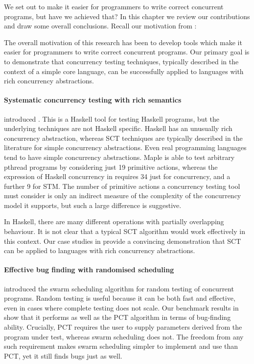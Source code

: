 We set out to make it easier for programmers to write correct
concurrent programs, but have we achieved that?  In this chapter we
review our contributions and draw some overall conclusions.  Recall
our motivation from :

\begin{displayquote}
  The overall motivation of this research has been to develop tools
  which make it easier for programmers to write correct concurrent
  programs.  Our primary goal is to demonstrate that concurrency
  testing techniques, typically described in the context of a simple
  core language, can be successfully applied to languages with rich
  concurrency abstractions.
\end{displayquote}

\paragraph{Systematic concurrency testing with rich semantics}
 introduced \dejafu{}.  This is a Haskell tool for
testing Haskell programs, but the underlying techniques are not
Haskell specific.  Haskell has an unusually rich concurrency
abstraction, whereas SCT techniques are typically described in the
literature for simple concurrency abstractions.  Even real programming
languages tend to have simple concurrency abstractions.
Maple \parencite{yu2012} is able to test arbitrary pthread programs by
considering just 19 primitive actions, whereas the expression of
Haskell concurrency in \dejafu{} requires 34 just for concurrency, and
a further 9 for STM.  The number of primitive actions a concurrency
testing tool must consider is only an indirect measure of the
complexity of the concurrency model it supports, but such a large
difference is suggestive.

In Haskell, there are many different operations with partially
overlapping behaviour.  It is not clear that a typical SCT algorithm
would work effectively in this context.  Our case studies in
 provide a convincing demonstration that
SCT can be applied to languages with rich concurrency abstractions.

\paragraph{Effective bug finding with randomised scheduling}
 introduced the swarm scheduling algorithm for
random testing of concurrent programs.  Random testing is useful
because it can be both fast and effective, even in cases where
complete testing does not scale.  Our benchmark results in
 show that it performs as well as the PCT
algorithm \parencite{burckhardt2010} in terms of bug-finding ability.
Crucially, PCT requires the user to supply parameters derived from the
program under test, whereas swarm scheduling does not.  The freedom
from any such requirement makes swarm scheduling simpler to implement
and use than PCT, yet it still finds bugs just as well.

